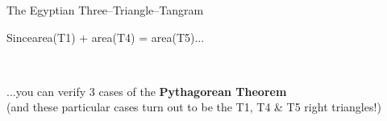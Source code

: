 \documentclass[14pt]{beamer}
\begin{document}
    \begin{frame}{The Egyptian Three--Triangle--Tangram}
        \begin{center}
            Since\quad area(T1) + area(T4) = area(T5)\quad...

            \bigskip \bigskip

            \!\!\!\!
            \qquad
             \\

            \bigskip \bigskip

            ...you can verify 3 cases of the \textbf{Pythagorean Theorem}\\
            {\footnotesize (and these particular cases turn out to be the T1, T4 \& T5 right triangles!)}
        \end{center}
    \end{frame}
\end{document}
